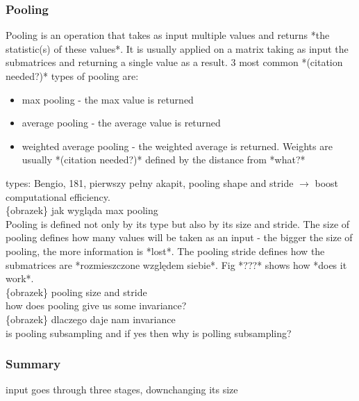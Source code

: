 \documentclass[a4paper,10pt]{report}
\begin{document}
	\subsubsection{Pooling} %
	  Pooling is an operation that takes as input multiple values and returns *the statistic(s) of these values*. It is usually applied on a matrix taking as input the submatrices and returning a single value as a result. 3 most common *(citation needed?)* types of pooling are:
	  \begin{itemize}
	   \item max pooling - the max value is returned
	   \item average pooling - the average value is returned
	   \item weighted average pooling - the weighted average is returned. Weights are usually *(citation needed?)* defined by the distance from *what?*
	  \end{itemize}
	  
	  types: Bengio, 181, pierwszy pełny akapit, pooling shape and stride $\rightarrow$ boost computational efficiency. \\

	  \{obrazek\} jak wygląda max pooling \\
	  
	  Pooling is defined not only by its type but also by its size and stride. The size of pooling defines how many values will be taken as an input - the bigger the size of pooling, the more information is *lost*. The pooling stride defines how the submatrices are *rozmieszczone względem siebie*. Fig *???* shows how *does it work*. \\
	  
	  \{obrazek\} pooling size and stride \\
	  
	  how does pooling give us some invariance? \\ 
	  
	  \{obrazek\} dlaczego daje nam invariance\\
	  
	  is pooling subsampling and if yes then why is polling subsampling? \\ 
	
	\subsubsection{Summary} %
	  input goes through three stages, downchanging its size
	  
\end{document}
